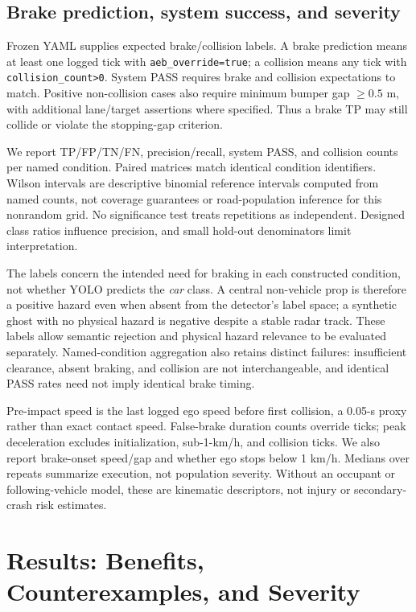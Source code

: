 \documentclass[conference]{IEEEtran}
\begin{document}
\subsection{Brake prediction, system success, and severity}
Frozen YAML supplies expected brake/collision labels. A brake prediction means
at least one logged tick with \texttt{aeb\_override=true}; a collision means any
tick with \texttt{collision\_count>0}. System PASS requires brake and collision
expectations to match. Positive non-collision cases also require minimum bumper
gap $\geq0.5$ m, with additional lane/target assertions where specified. Thus a
brake TP may still collide or violate the stopping-gap criterion.

We report TP/FP/TN/FN, precision/recall, system PASS, and collision counts per
named condition. Paired matrices match identical condition identifiers. Wilson
intervals are descriptive binomial reference intervals computed from named
counts, not coverage guarantees or road-population inference for this nonrandom
grid. No significance test treats repetitions as independent. Designed class
ratios influence precision, and small hold-out denominators limit interpretation.

The labels concern the intended need for braking in each constructed condition,
not whether YOLO predicts the \emph{car} class. A central non-vehicle prop is
therefore a positive hazard even when absent from the detector's label space;
a synthetic ghost with no physical hazard is negative despite a stable radar
track. These labels allow semantic rejection and physical hazard relevance to
be evaluated separately. Named-condition aggregation also retains distinct
failures: insufficient clearance, absent braking, and collision are not
interchangeable, and identical PASS rates need not imply identical brake timing.

Pre-impact speed is the last logged ego speed before first collision, a 0.05-s
proxy rather than exact contact speed. False-brake duration counts override
ticks; peak deceleration excludes initialization, sub-1-km/h, and collision
ticks. We also report brake-onset speed/gap and whether ego stops below 1 km/h.
Medians over repeats summarize execution, not population severity. Without an
occupant or following-vehicle model, these are kinematic descriptors, not injury
or secondary-crash risk estimates.

\section{Results: Benefits, Counterexamples, and Severity}
\end{document}
